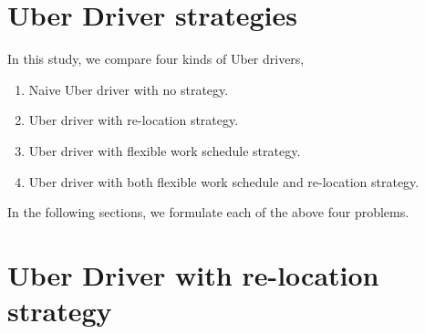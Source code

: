 \section{Uber Driver strategies}
In this study, we compare four kinds of Uber drivers, 
\begin{enumerate}
    \item Naive Uber driver with no strategy.
    \item Uber driver with re-location strategy.
    \item Uber driver with flexible work schedule strategy.
    \item Uber driver with both flexible work schedule and re-location strategy.
\end{enumerate}
In the following sections, we formulate each of the above four problems.

\section{Uber Driver with re-location strategy}

\\

